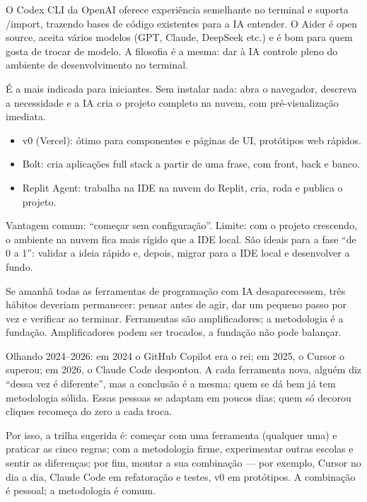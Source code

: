 
O Codex CLI da OpenAI oferece experiência semelhante no terminal e suporta /import, trazendo bases de código existentes para a IA entender. O Aider é open source, aceita vários modelos (GPT, Claude, DeepSeek etc.) e é bom para quem gosta de trocar de modelo. A filosofia é a mesma: dar à IA controle pleno do ambiente de desenvolvimento no terminal.


É a mais indicada para iniciantes. Sem instalar nada: abra o navegador, descreva a necessidade e a IA cria o projeto completo na nuvem, com pré-visualização imediata.

\begin{itemize}
  \item v0 (Vercel): ótimo para componentes e páginas de UI, protótipos web rápidos.
  \item Bolt: cria aplicações full stack a partir de uma frase, com front, back e banco.
  \item Replit Agent: trabalha na IDE na nuvem do Replit, cria, roda e publica o projeto.
\end{itemize}

Vantagem comum: “começar sem configuração”. Limite: com o projeto crescendo, o ambiente na nuvem fica mais rígido que a IDE local. São ideais para a fase “de 0 a 1”: validar a ideia rápido e, depois, migrar para a IDE local e desenvolver a fundo.


Se amanhã todas as ferramentas de programação com IA desaparecessem, três hábitos deveriam permanecer: pensar antes de agir, dar um pequeno passo por vez e verificar ao terminar. Ferramentas são amplificadores; a metodologia é a fundação. Amplificadores podem ser trocados, a fundação não pode balançar.

Olhando 2024–2026: em 2024 o GitHub Copilot era o rei; em 2025, o Cursor o superou; em 2026, o Claude Code despontou. A cada ferramenta nova, alguém diz “dessa vez é diferente”, mas a conclusão é a mesma: quem se dá bem já tem metodologia sólida. Essas pessoas se adaptam em poucos dias; quem só decorou cliques recomeça do zero a cada troca.

Por isso, a trilha sugerida é: começar com uma ferramenta (qualquer uma) e praticar as cinco regras; com a metodologia firme, experimentar outras escolas e sentir as diferenças; por fim, montar a sua combinação — por exemplo, Cursor no dia a dia, Claude Code em refatoração e testes, v0 em protótipos. A combinação é pessoal; a metodologia é comum.

